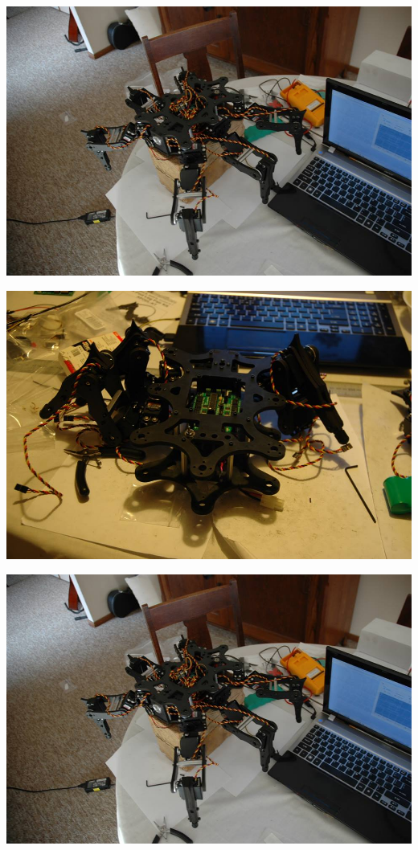     
    			\centerline{\includegraphics[width=\linewidth]{images/apod_build3}}
    			\centerline{\includegraphics[width=\linewidth]{images/apod_build2}}
    			\centerline{\includegraphics[width=\linewidth]{images/apod_build3}}
